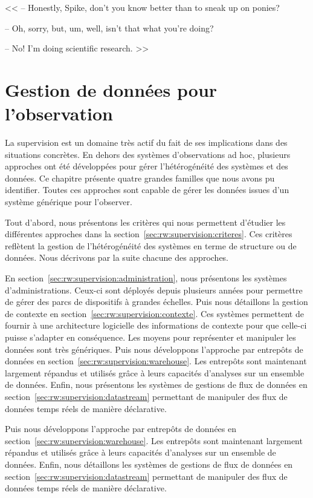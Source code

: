 \begin{savequote}[6cm]
<< -- Honestly, Spike, don't you know better than to sneak up on ponies?

-- Oh, sorry, but, um, well, isn't that what you're doing?

-- No! I'm doing scientific research. >>
\end{savequote}

\chapter{Gestion de données pour l'observation}\label{chap:rw:supervision}
\chaptertoc

La supervision est un domaine très actif du fait de ses implications dans des situations concrètes. En dehors des systèmes d'observations ad hoc, plusieurs approches ont été développées pour gérer l'hétérogénéité des systèmes et des données. Ce chapitre présente quatre grandes familles que nous avons pu identifier. Toutes ces approches sont capable de gérer les données issues d'un système générique pour l'observer.

Tout d'abord, nous présentons les critères qui nous permettent d'étudier les différentes approches dans la section~\ref{sec:rw:supervision:criteres}. Ces critères reflètent la gestion de l'hétérogénéité des systèmes en terme de structure ou de données. Nous décrivons par la suite chacune des approches.

En section~\ref{sec:rw:supervision:administration}, nous présentons les systèmes d'administrations. Ceux-ci sont déployés depuis plusieurs années pour permettre de gérer des parcs de dispositifs à grandes échelles. Puis nous détaillons la gestion de contexte en section~\ref{sec:rw:supervision:contexte}. Ces systèmes permettent de fournir à une architecture logicielle des informations de contexte pour que celle-ci puisse s'adapter en conséquence. Les moyens pour représenter et manipuler les données sont très génériques. Puis nous développons l'approche par entrepôts de données en section~\ref{sec:rw:supervision:warehouse}. Les entrepôts sont maintenant largement répandus et utilisés grâce à leurs capacités d'analyses sur un ensemble de données. Enfin, nous présentons les systèmes de gestions de flux de données en section~\ref{sec:rw:supervision:datastream} permettant de manipuler des flux de données temps réels de manière déclarative.

Puis nous développons l'approche par entrepôts de données en section~\ref{sec:rw:supervision:warehouse}. Les entrepôts sont maintenant largement répandus et utilisés grâce à leurs capacités d'analyses sur un ensemble de données. Enfin, nous détaillons les systèmes de gestions de flux de données en section~\ref{sec:rw:supervision:datastream} permettant de manipuler des flux de données temps réels de manière déclarative.







